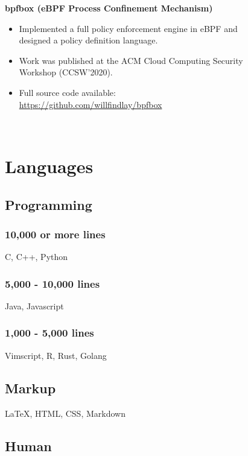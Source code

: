 \documentclass[
    10pt,
]
{article}
\begin{document}
\begin{figure}
\begin{minipage}[t]{0.65\textwidth}
\color{black}
\textbf{bpfbox (eBPF Process Confinement Mechanism)}
\color{gray}
\begin{itemize}[itemsep=0em]
    \item Implemented a full policy enforcement engine in eBPF and designed a policy definition language.
    \item Work was published at the ACM Cloud Computing Security Workshop (CCSW'2020).
    \item Full source code available: \url{https://github.com/willfindlay/bpfbox}
\end{itemize}

\end{minipage}
\hfill
\begin{minipage}[t]{0.32\textwidth}
\color{gray}
\ %
\vspace{-3.75em}

\section{Languages}

\subsection{Programming}

\subsubsection{10,000 or more lines}

C, C++, Python

\subsubsection{5,000 - 10,000 lines}

Java, Javascript

\subsubsection{1,000 - 5,000 lines}

Vimscript, R, Rust, Golang

\subsection{Markup}

\LaTeX, HTML, CSS, Markdown

\subsection{Human}


\end{minipage}
\end{figure}
\end{document}
